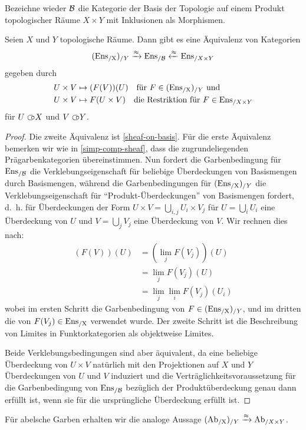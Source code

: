 Bezeichne wieder $\mathcal{B}$ die Kategorie der Basis der Topologie auf einem
Produkt topologischer Räume $X \times Y$ mit Inklusionen als
Morphismen.
\begin{satz}
  Seien $X$ und $Y$ topologische Räume. Dann gibt es eine Äquivalenz
  von Kategorien
  \[ (\operatorname{Ens_{/X}})_{/Y} \xrightarrow{\approx} \operatorname{Ens}_{/\mathcal{B}} \xleftarrow{\approx} \operatorname{Ens}_{/X \times Y} \]
  gegeben durch
  \begin{align*}
    U \times V &\mapsto (F(V))(U) \quad
    \text{für } F \in (\operatorname{Ens_{/X}})_{/Y} \text{ und} \\
     U \times V &\mapsto F(U \times V) \quad
     \text{die Restriktion für } F \in \operatorname{Ens}_{/X \times Y}
  \end{align*}
  für $U \subset\kern-0.58em\circ X$ und $V \subset\kern-0.58em\circ Y$.
\end{satz}
\begin{proof}
  Die zweite Äquivalenz ist \ref{sheaf-on-basis}. Für die erste
  Äquivalenz bemerken wir wie in \ref{simp-comp-sheaf}, dass die
  zugrundeliegenden Prägarbenkategorien übereinstimmen. Nun fordert
  die Garbenbedingung für $\operatorname{Ens}_{/\mathcal{B}}$ die Verklebungseigenschaft für
  beliebige Überdeckungen von Basismengen durch Basismengen, während
  die Garbenbedingungen für $(\operatorname{Ens_{/X}})_{/Y}$ die Verklebungseigenschaft
  für ``Produkt-Überdeckungen'' von Basismengen fordert, d.~h. für
  Überdeckungen der Form $U \times V = \bigcup_{i,j} U_i \times V_j$
  für $U = \bigcup_i U_i$ eine Überdeckung von $U$ und $V = \bigcup_j
  V_j$ eine Überdeckung von $V$. Wir rechnen dies nach:
  \begin{align*}
    (F(V))(U)
    &= (\lim_j F(V_j))(U) \\
    &= \lim_j F(V_j)(U) \\
    &= \lim_j \lim_i F(V_j)(U_i)
  \end{align*}
  wobei im ersten Schritt die Garbenbedingung von $F \in
  (\operatorname{Ens_{/X}})_{/Y}$, und im dritten die von $F(V_j) \in \operatorname{Ens_{/X}}$ verwendet
  wurde. Der zweite Schritt ist die Beschreibung von Limites in
  Funktorkategorien als objektweise Limites.


  Beide Verklebungsbedingungen sind aber äquivalent, da eine beliebige
  Überdeckung von $U \times V$ natürlich mit den Projektionen auf $X$
  und $Y$ Überdeckungen von $U$ und $V$ induziert und die
  Verträglichkeitsvoraussetzung für die Garbenbedingung von
  $\operatorname{Ens}_{/\mathcal{B}}$ bezüglich der Produktüberdeckung genau dann erfüllt
  ist, wenn sie für die ursprüngliche Überdeckung erfüllt ist.
\end{proof}
\begin{bem}
  Für abelsche Garben erhalten wir die analoge Aussage $(\operatorname{Ab_{/X}})_{/Y}
  \xrightarrow{\approx} \operatorname{Ab}_{/X \times Y}$.
\end{bem}

